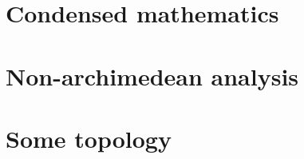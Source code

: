             \minitoc
            
            
            
            
            
        \chapter{Condensed mathematics}
            \begin{abstract}
            
            \end{abstract}
            
            \minitoc
            
            
            
            

        \begin{appendices}
            \chapter{Non-archimedean analysis}
                \begin{abstract}
                    
                \end{abstract}
                
                \minitoc
        
            \chapter{Some topology}
                \begin{abstract}
                    
                \end{abstract}
                
                \minitoc
                
                
                
                
                
                
        \end{appendices}

